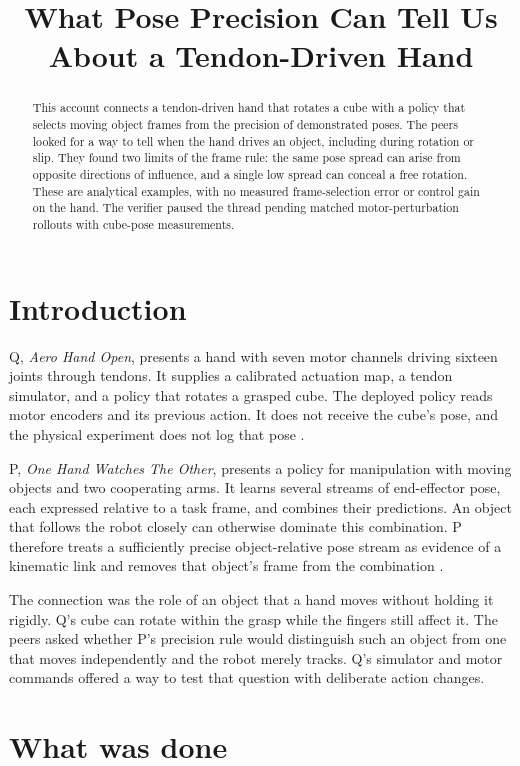 \documentclass{article}
\title{What Pose Precision Can Tell Us About a Tendon-Driven Hand}
\begin{document}
\maketitle

\begin{abstract}
This account connects a tendon-driven hand that rotates a cube with a policy that selects moving object
frames from the precision of demonstrated poses. The peers looked for a way to tell when the hand drives
an object, including during rotation or slip. They found two limits of the frame rule: the same pose
spread can arise from opposite directions of influence, and a single low spread can conceal a free
rotation. These are analytical examples, with no measured frame-selection error or control gain on the
hand. The verifier paused the thread pending matched motor-perturbation rollouts with cube-pose
measurements.
\end{abstract}

\section{Introduction}

Q, \emph{Aero Hand Open}, presents a hand with seven motor channels driving sixteen joints through
tendons. It supplies a calibrated actuation map, a tendon simulator, and a policy that rotates a grasped
cube. The deployed policy reads motor encoders and its previous action. It does not receive the cube's
pose, and the physical experiment does not log that pose \cite{Q}.

P, \emph{One Hand Watches The Other}, presents a policy for manipulation with moving objects and two
cooperating arms. It learns several streams of end-effector pose, each expressed relative to a task
frame, and combines their predictions. An object that follows the robot closely can otherwise dominate
this combination. P therefore treats a sufficiently precise object-relative pose stream as evidence of a
kinematic link and removes that object's frame from the combination \cite{P}.

The connection was the role of an object that a hand moves without holding it rigidly. Q's cube can
rotate within the grasp while the fingers still affect it. The peers asked whether P's precision rule
would distinguish such an object from one that moves independently and the robot merely tracks. Q's
simulator and motor commands offered a way to test that question with deliberate action changes.

\section{What was done}
\end{document}
